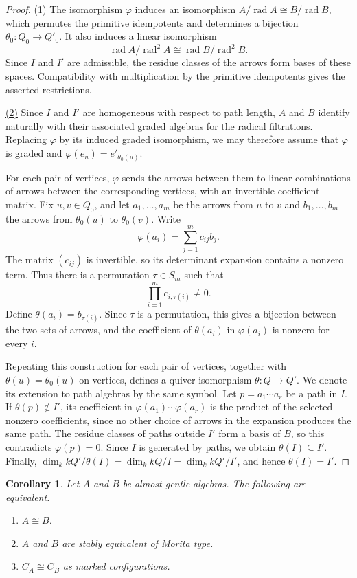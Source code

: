 \documentclass[11pt]{article}
\newcommand{\rad}{\operatorname{rad}}
\newtheorem{corollary}[theorem]{Corollary}
\theoremstyle{definition}
\begin{document}
		\begin{proof}
			\underline{(1)}
			The isomorphism $\varphi$ induces an isomorphism $A/\rad A\cong B/\rad B$, which permutes the primitive idempotents and determines a bijection $\theta_0:Q_0\to Q'_0$. It also induces a linear isomorphism
			\[
				\rad A/\rad^2 A\cong\rad B/\rad^2 B.
			\]
			Since $I$ and $I'$ are admissible, the residue classes of the arrows form bases of these spaces. Compatibility with multiplication by the primitive idempotents gives the asserted restrictions.

			\underline{(2)}
			Since $I$ and $I'$ are homogeneous with respect to path length, $A$ and $B$ identify naturally with their associated graded algebras for the radical filtrations. Replacing $\varphi$ by its induced graded isomorphism, we may therefore assume that $\varphi$ is graded and $\varphi(e_u)=e'_{\theta_0(u)}$.

			For each pair of vertices, $\varphi$ sends the arrows between them to linear combinations of arrows between the corresponding vertices, with an invertible coefficient matrix. Fix $u,v\in Q_0$, and let $a_1,\ldots,a_m$ be the arrows from $u$ to $v$ and $b_1,\ldots,b_m$ the arrows from $\theta_0(u)$ to $\theta_0(v)$. Write
			\[
				\varphi(a_i)=\sum_{j=1}^m c_{ij}b_j.
			\]
			The matrix $(c_{ij})$ is invertible, so its determinant expansion contains a nonzero term. Thus there is a permutation $\tau\in S_m$ such that
			$$\prod_{i=1}^m c_{i,\tau(i)}\ne0.$$
			Define $\theta(a_i)=b_{\tau(i)}$. Since $\tau$ is a permutation, this gives a bijection between the two sets of arrows, and the coefficient of $\theta(a_i)$ in $\varphi(a_i)$ is nonzero for every $i$.

			Repeating this construction for each pair of vertices, together with $\theta(u)=\theta_0(u)$ on vertices, defines a quiver isomorphism $\theta:Q\to Q'$. We denote its extension to path algebras by the same symbol.
			Let $p=a_1\cdots a_r$ be a path in $I$. If $\theta(p)\notin I'$, its coefficient in $\varphi(a_1)\cdots\varphi(a_r)$ is the product of the selected nonzero coefficients, since no other choice of arrows in the expansion produces the same path. The residue classes of paths outside $I'$ form a basis of $B$, so this contradicts $\varphi(p)=0$. Since $I$ is generated by paths, we obtain $\theta(I)\subseteq I'$. Finally,
			$\dim_k kQ'/\theta(I)=\dim_k kQ/I=\dim_k kQ'/I'$,
			and hence $\theta(I)=I'$.
		\end{proof}

		\begin{corollary}\label{corollary of marked configuration isomorphism}
			Let $A$ and $B$ be almost gentle algebras. The following are equivalent.
			\begin{enumerate}
				\item $A\cong B$.
				\item $A$ and $B$ are stably equivalent of Morita type.
				\item $C_A\cong C_B$ as marked configurations.
			\end{enumerate}
		\end{corollary}
\end{document}
